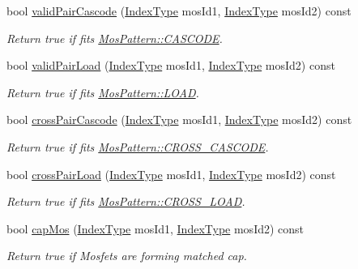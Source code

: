 \begin{DoxyCompactItemize}
bool \hyperlink{classPattern_ab1334774aab3ce88b1d2d799e31f3bd9}{valid\+Pair\+Cascode} (\hyperlink{type_8h_a581e8093e28e7362f2b6937296190676}{Index\+Type} mos\+Id1, \hyperlink{type_8h_a581e8093e28e7362f2b6937296190676}{Index\+Type} mos\+Id2) const
\begin{DoxyCompactList}\small\item\em Return true if fits \hyperlink{type_8h_af19eddb079bfea723256710b029c38e8aac50017227efb09ec529757764e5187c}{Mos\+Pattern\+::\+C\+A\+S\+C\+O\+DE}. \end{DoxyCompactList}\item 
bool \hyperlink{classPattern_acae638957d000c1a163f949c369d5ef4}{valid\+Pair\+Load} (\hyperlink{type_8h_a581e8093e28e7362f2b6937296190676}{Index\+Type} mos\+Id1, \hyperlink{type_8h_a581e8093e28e7362f2b6937296190676}{Index\+Type} mos\+Id2) const
\begin{DoxyCompactList}\small\item\em Return true if fits \hyperlink{type_8h_af19eddb079bfea723256710b029c38e8a615d2885ef7576cedd9aafbb2578f028}{Mos\+Pattern\+::\+L\+O\+AD}. \end{DoxyCompactList}\item 
bool \hyperlink{classPattern_a371cef1fc7d0c4d5b291d80dc5c4b777}{cross\+Pair\+Cascode} (\hyperlink{type_8h_a581e8093e28e7362f2b6937296190676}{Index\+Type} mos\+Id1, \hyperlink{type_8h_a581e8093e28e7362f2b6937296190676}{Index\+Type} mos\+Id2) const
\begin{DoxyCompactList}\small\item\em Return true if fits \hyperlink{type_8h_af19eddb079bfea723256710b029c38e8adb952aa3809767bf108688a754ebbf2c}{Mos\+Pattern\+::\+C\+R\+O\+S\+S\+\_\+\+C\+A\+S\+C\+O\+DE}. \end{DoxyCompactList}\item 
bool \hyperlink{classPattern_afe6e5456a639417112340f5f9d164b32}{cross\+Pair\+Load} (\hyperlink{type_8h_a581e8093e28e7362f2b6937296190676}{Index\+Type} mos\+Id1, \hyperlink{type_8h_a581e8093e28e7362f2b6937296190676}{Index\+Type} mos\+Id2) const
\begin{DoxyCompactList}\small\item\em Return true if fits \hyperlink{type_8h_af19eddb079bfea723256710b029c38e8a19ddbfeab78ac1a4bbe1a186828c5d8d}{Mos\+Pattern\+::\+C\+R\+O\+S\+S\+\_\+\+L\+O\+AD}. \end{DoxyCompactList}\item 
bool \hyperlink{classPattern_acbeabf067e49ed1ea743d647f541a3f4}{cap\+Mos} (\hyperlink{type_8h_a581e8093e28e7362f2b6937296190676}{Index\+Type} mos\+Id1, \hyperlink{type_8h_a581e8093e28e7362f2b6937296190676}{Index\+Type} mos\+Id2) const
\begin{DoxyCompactList}\small\item\em Return true if Mosfets are forming matched cap. \end{DoxyCompactList}\end{DoxyCompactItemize}
